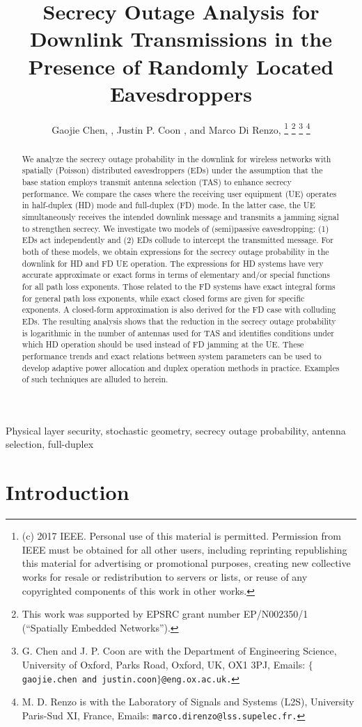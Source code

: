 \documentclass[10pt]{IEEEtran}
\title{Secrecy Outage Analysis for Downlink Transmissions in the Presence of Randomly Located Eavesdroppers}
\author{ Gaojie Chen, \IEEEmembership{Member, IEEE}, Justin P. Coon \IEEEmembership{Senior Member, IEEE}, and Marco Di Renzo, \IEEEmembership{Senior Member, IEEE}
\thanks{(c) 2017 IEEE. Personal use of this material is permitted. Permission from IEEE must be obtained for all other users, including reprinting republishing this material for advertising or promotional purposes, creating new collective works for resale or redistribution to servers or lists, or reuse of any copyrighted components of this work in other works. }
\thanks{This work was supported by EPSRC grant number EP/N002350/1 (``Spatially Embedded Networks'').}
\thanks{G. Chen  and J. P. Coon are with the Department of Engineering  Science, University of Oxford, Parks Road, Oxford, UK, OX1 3PJ, Emails: {\tt $\{$gaojie.chen and justin.coon$\}$@eng.ox.ac.uk.}}
\thanks{M. D. Renzo is with the Laboratory of Signals and Systems (L2S), University Paris-Sud XI, France, Emails: {\tt marco.direnzo@lss.supelec.fr.}}
\vspace{1.2mm}\\
\fontsize{10}{10}\selectfont\rmfamily\itshape
}
\begin{document}
\begin{singlespace}
\maketitle
\end{singlespace}

\thispagestyle{empty}
\begin{abstract}
We analyze the secrecy outage probability in the downlink for wireless networks with spatially (Poisson) distributed eavesdroppers (EDs) under the assumption that the base station employs transmit antenna selection (TAS) to enhance secrecy performance.  We compare the cases where the receiving user equipment (UE) operates in half-duplex (HD) mode and full-duplex (FD) mode.  In the latter case, the UE simultaneously receives the intended downlink message and transmits a jamming signal to strengthen secrecy.  We investigate two models of (semi)passive eavesdropping: (1) EDs act independently and (2) EDs collude to intercept the transmitted message.  For both of these models, we obtain expressions for the secrecy outage probability in the downlink for HD and FD UE operation.  The expressions for HD systems have very accurate approximate or exact forms in terms of elementary and/or special functions for all path loss exponents.  Those related to the FD systems have exact integral forms for general path loss exponents, while exact closed forms are given for specific exponents. A closed-form approximation is also derived for the FD case with colluding EDs.  The resulting analysis shows that the reduction in the secrecy outage probability is logarithmic in the number of antennas used for TAS and identifies conditions under which HD operation should be used instead of FD jamming at the UE. These performance trends and exact relations between system parameters can be used to develop adaptive power allocation and duplex operation methods in practice. Examples of such techniques are alluded to herein.

\end{abstract}

\begin{IEEEkeywords}
Physical layer security, stochastic geometry, secrecy outage probability, antenna selection, full-duplex
\end{IEEEkeywords}

\section{Introduction}
\end{document}
